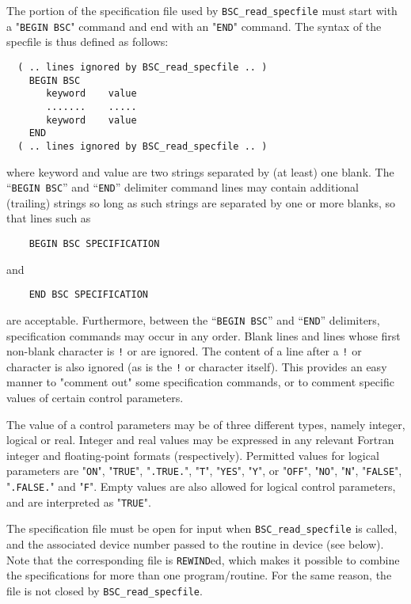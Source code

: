 \documentclass{galahad}
\newcommand{\packagename}{BSC}
\begin{document}
The portion of the specification file used by 
{\tt \packagename\_read\_specfile}
must start
with a "{\tt BEGIN \packagename}" command and end with an 
"{\tt END}" command.  The syntax of the specfile is thus defined as follows:
\begin{verbatim}
  ( .. lines ignored by BSC_read_specfile .. )
    BEGIN BSC
       keyword    value
       .......    .....
       keyword    value
    END 
  ( .. lines ignored by BSC_read_specfile .. )
\end{verbatim}
where keyword and value are two strings separated by (at least) one blank.
The ``{\tt BEGIN \packagename}'' and ``{\tt END}'' delimiter command lines 
may contain additional (trailing) strings so long as such strings are 
separated by one or more blanks, so that lines such as
\begin{verbatim}
    BEGIN BSC SPECIFICATION
\end{verbatim}
and
\begin{verbatim}
    END BSC SPECIFICATION
\end{verbatim}
are acceptable. Furthermore, 
between the
``{\tt BEGIN \packagename}'' and ``{\tt END}'' delimiters,
specification commands may occur in any order.  Blank lines and
lines whose first non-blank character is {\tt !} or {\tt *} are ignored. 
The content 
of a line after a {\tt !} or {\tt *} character is also 
ignored (as is the {\tt !} or {\tt *}
character itself). This provides an easy manner to "comment out" some 
specification commands, or to comment specific values 
of certain control parameters.  

The value of a control parameters may be of three different types, namely
integer, logical or real.
Integer and real values may be expressed in any relevant Fortran integer and
floating-point formats (respectively). Permitted values for logical
parameters are "{\tt ON}", "{\tt TRUE}", "{\tt .TRUE.}", "{\tt T}", 
"{\tt YES}", "{\tt Y}", or "{\tt OFF}", "{\tt NO}",
"{\tt N}", "{\tt FALSE}", "{\tt .FALSE.}" and "{\tt F}". 
Empty values are also allowed for 
logical control parameters, and are interpreted as "{\tt TRUE}".  

The specification file must be open for 
input when {\tt \packagename\_read\_specfile}
is called, and the associated device number 
passed to the routine in device (see below). 
Note that the corresponding 
file is {\tt REWIND}ed, which makes it possible to combine the specifications 
for more than one program/routine.  For the same reason, the file is not
closed by {\tt \packagename\_read\_specfile}.
\end{document}
